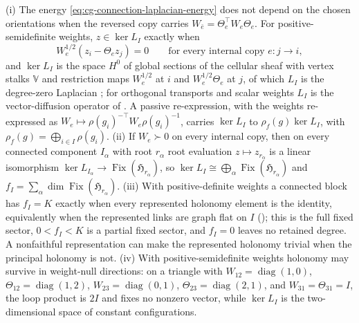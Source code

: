 (i) The energy \eqref{eq:cg-connection-laplacian-energy} does not depend on the chosen orientations when
the reversed copy carries $W_{\bar e}=\Theta_e^\top W_e\Theta_e$. For positive-semidefinite weights,
$z\in\ker L_I$ exactly when
\begin{equation}
W_e^{1/2}(z_i-\Theta_ez_j)=0\qquad\text{for every internal copy }e:j\to i,
\label{eq:cg-psd-section-constraint}
\end{equation}
and $\ker L_I$ is the space $H^0$ of global sections of the cellular sheaf with vertex stalks $\mathbb V$ and
restriction maps $W_e^{1/2}$ at $i$ and $W_e^{1/2}\Theta_e$ at $j$, of which $L_I$ is the degree-zero
Laplacian \citep[Sec.~3.2 and Thm.~3.1]{HansenGhrist2019}; for orthogonal transports and scalar weights
$L_I$ is the vector-diffusion operator of \citet[Sec.~3]{SingerWu2012}. A passive re-expression, with the
weights re-expressed as $W_e\mapsto\rho(g_i)^{-\top}W_e\rho(g_i)^{-1}$, carries $\ker L_I$ to
$\rho_f(g)\ker L_I$, with $\rho_f(g)=\bigoplus_{i\in I}\rho(g_i)$. (ii) If $W_e\succ0$ on every internal
copy, then on every connected component $I_\alpha$ with root $r_\alpha$ root evaluation
$z\mapsto z_{r_\alpha}$ is a linear isomorphism
$\ker L_{I_\alpha}\to\operatorname{Fix}(\mathfrak H_{r_\alpha})$, so
$\ker L_I\cong\bigoplus_\alpha\operatorname{Fix}(\mathfrak H_{r_\alpha})$ and
$f_I=\sum_\alpha\dim\operatorname{Fix}(\mathfrak H_{r_\alpha})$. (iii) With positive-definite weights a
connected block has $f_I=K$ exactly when every represented holonomy element is the identity, equivalently
when the represented links are graph flat on $I$ (); this is the
full fixed sector, $0<f_I<K$ is a partial fixed sector, and $f_I=0$ leaves no retained degree. A
nonfaithful representation can make the represented holonomy trivial when the principal holonomy is not.
(iv) With positive-semidefinite weights holonomy may survive in weight-null directions: on a triangle with
$W_{12}=\operatorname{diag}(1,0)$, $\Theta_{12}=\operatorname{diag}(1,2)$, $W_{23}=\operatorname{diag}(0,1)$,
$\Theta_{23}=\operatorname{diag}(2,1)$, and $W_{31}=\Theta_{31}=I$, the loop product is $2I$ and fixes no
nonzero vector, while $\ker L_I$ is the two-dimensional space of constant configurations.


